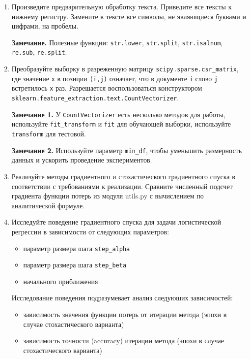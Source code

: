 \documentclass[10pt,fleqn]{article}
\begin{document}
\begin{enumerate}
    \item Произведите предварительную обработку текста. Приведите все тексты к нижнему регистру. Замените в тексте все символы, не являющиеся буквами и цифрами, на пробелы.

    \textbf{Замечание.}
    Полезные функции: \verb|str.lower|,  \verb|str.split|, \verb|str.isalnum|, \verb|re.sub|, \verb|re.split|.

    \item Преобразуйте выборку в разреженную матрицу \verb|scipy.sparse.csr_matrix|, где значение \verb|x| в позиции \verb|(i,j)| означает, что в документе \verb|i| слово \verb|j| встретилось \verb|x| раз.
    Разрешается воспользоваться конструктором  \verb|sklearn.feature_extraction.text.CountVectorizer|.

    \textbf{Замечание 1.} У \verb|CountVectorizer| есть несколько методов для работы, используйте \texttt{fit\_transform} и \texttt{fit} для обучающей выборки, используйте \texttt{transform} для тестовой.

    \textbf{Замечание 2.} Используйте параметр \texttt{min\_df}, чтобы уменьшить размерность данных и ускорить проведение экспериментов.

    \item Реализуйте методы градиентного и стохастического градиентного спуска в соответствии с требованиями к реализации. Сравните численный подсчет градиента функции потерь из модуля utils.py с вычислением по аналитической формуле.
    
    \item Исследуйте поведение градиентного спуска для задачи логистической регрессии в зависимости от следующих параметров:
    \begin{itemize}
        \item параметр размера шага \texttt{step\_alpha}
        \item параметр размера шага \texttt{step\_beta}
        \item начального приближения
    \end{itemize}

    Исследование поведения подразумевает анализ следуюших зависимостей:
    \begin{itemize}
        \item зависимость значения функции потерь от итерации метода (эпохи в случае стохастического варианта)

        \item зависимость точности (accuracy) итерации метода (эпохи в случае стохастического варианта)
        

\end{itemize}
\end{enumerate}
\end{document}
